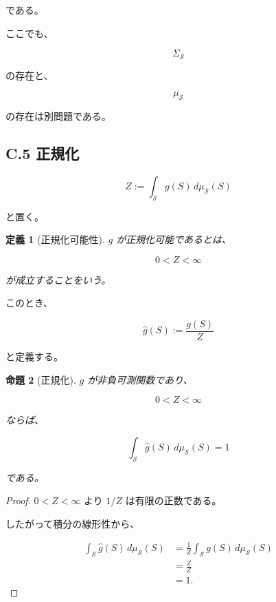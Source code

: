 \documentclass[a4paper,11pt]{article}
\newtheorem{definition}{定義}[section]
\newtheorem{proposition}[definition]{命題}
\newcommand{\Solver}{\mathcal{S}}
\begin{document}
である。

ここでも、

\begin{equation}
    \Sigma_{\Solver}
\end{equation}

の存在と、

\begin{equation}
    \mu_{\Solver}
\end{equation}

の存在は別問題である。


\subsection{C.5 正規化}

\begin{equation}
    Z
    :=
    \int_{\Solver}
    g(S)\,d\mu_{\Solver}(S)
\end{equation}

と置く。

\begin{definition}[正規化可能性]
$g$ が正規化可能であるとは、

\begin{equation}
    0<Z<\infty
\end{equation}

が成立することをいう。
\end{definition}

このとき、

\begin{equation}
    \widehat g(S)
    :=
    \frac{g(S)}{Z}
\end{equation}

と定義する。

\begin{proposition}[正規化]
$g$ が非負可測関数であり、

\begin{equation}
    0<Z<\infty
\end{equation}

ならば、

\begin{equation}
    \int_{\Solver}
    \widehat g(S)\,d\mu_{\Solver}(S)
    =
    1
\end{equation}

である。
\end{proposition}

\begin{proof}
$0<Z<\infty$ より $1/Z$ は有限の正数である。

したがって積分の線形性から、

\begin{align}
    \int_{\Solver}
    \widehat g(S)\,d\mu_{\Solver}(S)
    &=
    \frac1Z
    \int_{\Solver}
    g(S)\,d\mu_{\Solver}(S)
    \\
    &=
    \frac ZZ
    \\
    &=1.
\end{align}

\end{proof}
\end{document}
